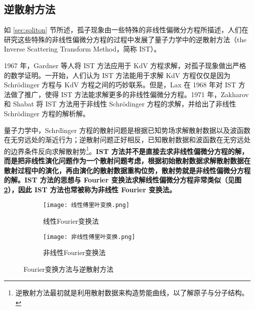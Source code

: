 \subsection{逆散射方法}
如 \ref{sec:soliton} 节所述，孤子现象由一些特殊的非线性偏微分方程所描述，人们在研究这些特殊的非线性偏微分方程的过程中发展了量子力学中的逆散射方法（the Inverse Scattering Transform Method，简称 IST）。

1967 年，Gardner 等人将 IST 方法应用于 KdV 方程求解，对孤子现象做出严格的数学证明。一开始，人们认为 IST 方法能用于求解 KdV 方程仅仅是因为 Schr\"odinger 方程与 KdV 方程之间的巧妙联系。但是，Lax 在 1968 年对 IST 方法做了推广，使得 IST 方法能求解更多的非线性偏微分方程。1971 年，Zakharov 和 Shabat 将 IST 方法用于非线性 Schr\"odinger 方程的求解，并给出了非线性 Schr\"odinger 方程的解析解\cite{yangbojun,Zakharov}。

量子力学中，Schr\"dinger 方程的散射问题是根据已知势场求解散射数据以及波函数在无穷远处的渐近行为；逆散射问题正好相反，已知散射数据和波函数在无穷远处的边界条件反向求解散射势\footnote{逆散射方法最初就是利用散射数据来构造势能曲线，以了解原子与分子结构。}。{\bfseries IST 方法并不是直接去求非线性偏微分方程的解，而是把非线性演化问题作为一个散射问题考虑，根据初始散射数据求解散射数据在散射过程中的演化，再由演化的散射数据重构位势，散射势就是非线性偏微分方程的解。IST 方法的思想与 Fourier 变换法求解线性偏微分方程非常类似（见图\ref{fig:Fourier}），因此 IST 方法也常被称为非线性 Fourier 变换法\cite{liangkunmiao}。}
\begin{figure}[tbp]
    \centering
    \begin{subfigure}[t]{0.40\linewidth}
        \begin{minipage}[b]{1\linewidth}
        \texttt{[image: 线性傅里叶变换.png]}
        \caption{线性Fourier变换法}
        \label{fig:Fourier_pde}
        \end{minipage}
    \end{subfigure}
    \hspace{4ex}
    \begin{subfigure}[t]{0.40\linewidth}
        \begin{minipage}[b]{1\linewidth}
        \texttt{[image: 非线性傅里叶变换.png]}
        \caption{非线性Fourier变换法}
        \end{minipage}
    \end{subfigure}
    \caption{Fourier变换方法与逆散射方法}
    \label{fig:Fourier}
\end{figure}

